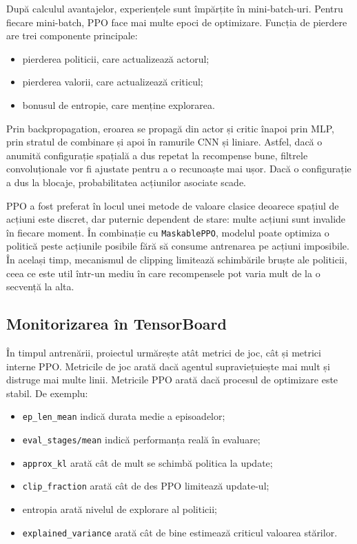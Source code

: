 \documentclass[12pt,a4paper]{article}
\begin{document}
După calculul avantajelor, experiențele sunt împărțite în mini-batch-uri. Pentru fiecare mini-batch, PPO face mai multe epoci de optimizare. Funcția de pierdere are trei componente principale:

\begin{itemize}
    \item pierderea politicii, care actualizează actorul;
    \item pierderea valorii, care actualizează criticul;
    \item bonusul de entropie, care menține explorarea.
\end{itemize}

Prin backpropagation, eroarea se propagă din actor și critic înapoi prin MLP, prin stratul de combinare și apoi în ramurile CNN și liniare. Astfel, dacă o anumită configurație spațială a dus repetat la recompense bune, filtrele convoluționale vor fi ajustate pentru a o recunoaște mai ușor. Dacă o configurație a dus la blocaje, probabilitatea acțiunilor asociate scade.

PPO a fost preferat în locul unei metode de valoare clasice deoarece spațiul de acțiuni este discret, dar puternic dependent de stare: multe acțiuni sunt invalide în fiecare moment. În combinație cu \texttt{MaskablePPO}, modelul poate optimiza o politică peste acțiunile posibile fără să consume antrenarea pe acțiuni imposibile. În același timp, mecanismul de clipping limitează schimbările bruște ale politicii, ceea ce este util într-un mediu în care recompensele pot varia mult de la o secvență la alta.

\subsection{Monitorizarea în TensorBoard}

În timpul antrenării, proiectul urmărește atât metrici de joc, cât și metrici interne PPO. Metricile de joc arată dacă agentul supraviețuiește mai mult și distruge mai multe linii. Metricile PPO arată dacă procesul de optimizare este stabil. De exemplu:

\begin{itemize}
    \item \texttt{ep\_len\_mean} indică durata medie a episoadelor;
    \item \texttt{eval\_stages/mean} indică performanța reală în evaluare;
    \item \texttt{approx\_kl} arată cât de mult se schimbă politica la update;
    \item \texttt{clip\_fraction} arată cât de des PPO limitează update-ul;
    \item entropia arată nivelul de explorare al politicii;
    \item \texttt{explained\_variance} arată cât de bine estimează criticul valoarea stărilor.
\end{itemize}
\end{document}
